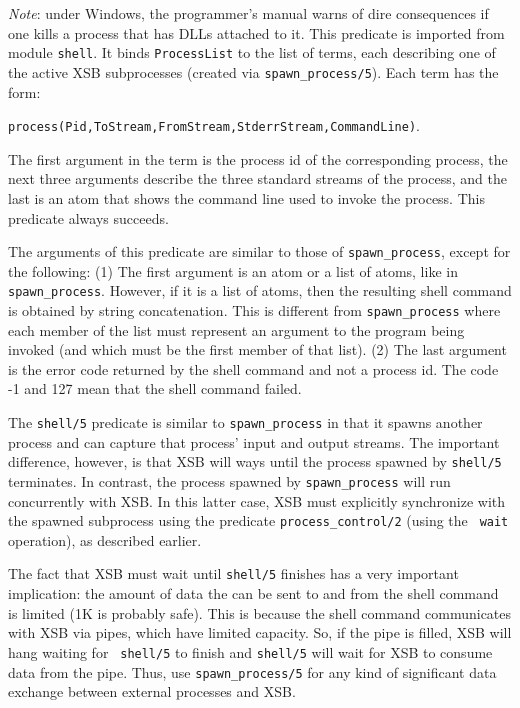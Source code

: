 \begin{description}
    \emph{Note}: under Windows, the programmer's manual warns of dire
    consequences if one kills a process that has DLLs attached to it.
%
    This predicate is imported from module {\tt shell}.
    It binds {\tt ProcessList} to the list of terms, each describing one of
    the active XSB subprocesses (created via \verb|spawn_process/5|).
    Each term has the form:
    \begin{center}
      \verb|process(Pid,ToStream,FromStream,StderrStream,CommandLine)|. 
    \end{center}
    The first argument in the term is the process id of the corresponding
    process, the next three arguments describe the three standard streams
    of the process, and the last is an atom that shows the command line used
    to invoke the process.
    This predicate always succeeds.

%
The arguments of this predicate are similar to those of
\verb|spawn_process|, except for the following: (1) The first argument
is an atom or a list of atoms, like in \verb|spawn_process|. However,
if it is a list of atoms, then the resulting shell command is obtained
by string concatenation. This is different from \verb|spawn_process|
where each member of the list must represent an argument to the
program being invoked (and which must be the first member of that
list).  (2) The last argument is the error code returned by the shell
command and not a process id. The code -1 and 127 mean that the shell
command failed.
    
    The {\tt shell/5} predicate is similar to \verb|spawn_process| in
    that it spawns another process and can capture that process' input
    and output streams.
%    
    The important difference, however, is that XSB will ways until the
    process spawned by {\tt shell/5} terminates. In contrast, the process
    spawned by \verb|spawn_process| will run concurrently with XSB.  In
    this latter case, XSB must explicitly synchronize with the spawned
    subprocess using the predicate \verb|process_control/2| (using the {\tt
      wait} operation), as described earlier.
    
    The fact that XSB must wait until {\tt shell/5} finishes has a very
    important implication: the amount of data the can be sent to and from
    the shell command is limited (1K is probably safe). This is because the
    shell command communicates with XSB via pipes, which have limited
    capacity.  So, if the pipe is filled, XSB will hang waiting for {\tt
      shell/5} to finish and {\tt shell/5} will wait for XSB to consume data
    from the pipe.  Thus, use \verb|spawn_process/5| for any kind of
    significant data exchange between external processes and XSB.
  

\end{description}
